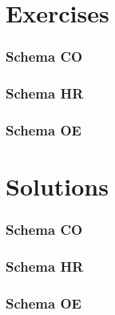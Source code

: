 \documentclass[12pt, letterpaper]{report}
\begin{document}


\part{Exercises}
\section{Schema CO}
\subsection{}


\section{Schema HR}
\section{Schema OE}

\part{Solutions}
\section{Schema CO}
\section{Schema HR}
\section{Schema OE}
\end{document}
